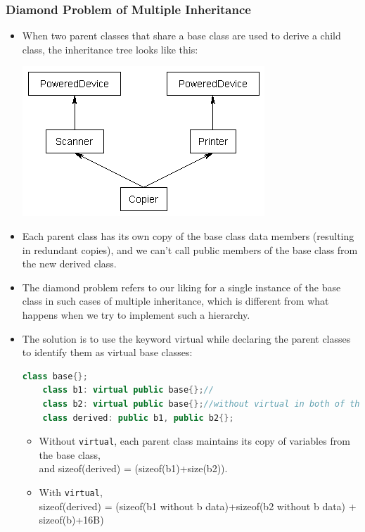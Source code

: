 \documentclass{report}
\begin{document}
\subsubsection{Diamond Problem of Multiple Inheritance}
\begin{itemize}
\item When two parent classes that share a base class are used to derive a child class, the inheritance tree looks like this:
\begin{center}
\includegraphics{rsrc/PoweredDevice2.png}
\end{center}
\item Each parent class has its own copy of the base class data members (resulting in redundant copies), and we can't call public members of the base class from the new derived class.
\item The diamond problem refers to our liking for a single instance of the base class in such cases of multiple inheritance, which is different from what happens when we try to implement such a hierarchy.
\item The solution is to use the keyword virtual while declaring the parent classes to identify them as virtual base classes:
\begin{lstlisting}[language=C++]
    class base{};
    class b1: virtual public base{};//
    class b2: virtual public base{};//without virtual in both of them, copies are made.
    class derived: public b1, public b2{};
\end{lstlisting}
\begin{itemize}
    \item Without \texttt{virtual}, each parent class maintains its copy of variables from the base class,\\
    and sizeof(derived) = (sizeof(b1)+size(b2)).
    \item With \texttt{virtual},\\ sizeof(derived) = (sizeof(b1 without b data)+sizeof(b2 without b data) + sizeof(b)+16B)

\end{itemize}
\end{itemize}
\end{document}

